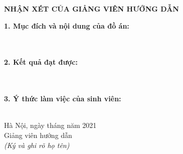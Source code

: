 \documentclass[a4paper, 12pt]{report}
\begin{document}
\begin{titlepage}
\begin{center}
\textbf{NHẬN XÉT CỦA GIẢNG VIÊN HƯỚNG DẪN}
\end{center}
\textbf{1. Mục đích và nội dung của đồ án:} \\\\
\\
\textbf{2. Kết quả đạt được:} \\\\
\\
\textbf{3. Ý thức làm việc của sinh viên: }\\\\
\begin{flushright}
Hà Nội, ngày \hspace{.5cm} tháng \hspace{.5cm} năm 2021\\
Giảng viên hướng dẫn \hspace*{1.1cm} \\
\textit{(Ký và ghi rõ họ tên)} \hspace*{1.2cm}
\end{flushright} 
\end{titlepage}




\end{document}
